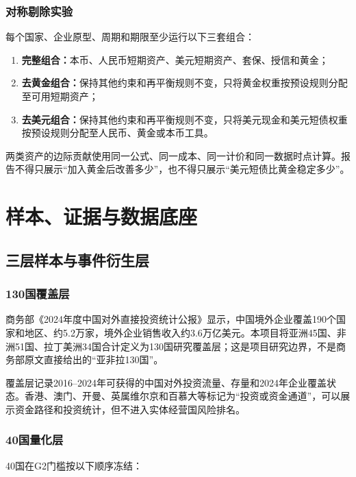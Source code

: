 \documentclass[UTF8,fontset=windows,12pt,openany]{ctexbook}
\begin{document}
\section{对称剔除实验}

每个国家、企业原型、周期和期限至少运行以下三套组合：

\begin{enumerate}
  \item \textbf{完整组合：}本币、人民币短期资产、美元短期资产、套保、授信和黄金；
  \item \textbf{去黄金组合：}保持其他约束和再平衡规则不变，只将黄金权重按预设规则分配至可用短期资产；
  \item \textbf{去美元组合：}保持其他约束和再平衡规则不变，只将美元现金和美元短债权重按预设规则分配至人民币、黄金或本币工具。
\end{enumerate}

两类资产的边际贡献使用同一公式、同一成本、同一计价和同一数据时点计算。报告不得只展示“加入黄金后改善多少”，也不得只展示“美元短债比黄金稳定多少”。

\part{样本、证据与数据底座}

\chapter{三层样本与事件衍生层}

\section{130国覆盖层}

商务部《2024年度中国对外直接投资统计公报》显示，中国境外企业覆盖190个国家和地区、约5.2万家，境外企业销售收入约3.6万亿美元\cite{mofcom2024}。本项目将亚洲45国、非洲51国、拉丁美洲34国合计定义为130国研究覆盖层；这是项目研究边界，不是商务部原文直接给出的“亚非拉130国”。

覆盖层记录2016--2024年可获得的中国对外投资流量、存量和2024年企业覆盖状态。香港、澳门、开曼、英属维尔京和百慕大等标记为“投资或资金通道”，可以展示资金路径和投资统计，但不进入实体经营国风险排名。

\section{40国量化层}

40国在G2门槛按以下顺序冻结：
\end{document}

